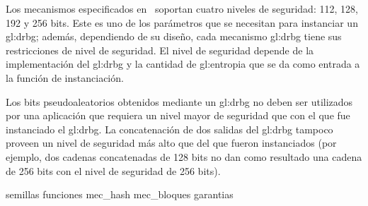 Los mecanismos especificados en~\cite{nist_aleatorios} soportan cuatro niveles
de seguridad: 112, 128, 192 y 256 bits. Este es uno de los parámetros que
se necesitan para instanciar un \gls{gl:drbg}; además, dependiendo de su diseño,
cada mecanismo  \gls{gl:drbg} tiene sus restricciones de nivel de seguridad.
El nivel de seguridad depende de la implementación del \gls{gl:drbg} y la
cantidad de \gls{gl:entropia} que se da como entrada a la función de
instanciación.

Los bits pseudoaleatorios obtenidos mediante un \gls{gl:drbg} no deben ser
utilizados por una aplicación que requiera un nivel mayor de seguridad que con
el que fue instanciado el \gls{gl:drbg}. La concatenación de dos salidas del
\gls{gl:drbg} tampoco proveen un nivel de seguridad más alto que del que fueron
instanciados (por ejemplo, dos cadenas concatenadas de 128 bits no dan como
resultado una cadena de 256 bits con el nivel de seguridad de 256 bits).

{semillas}
{funciones}
{mec_hash}
{mec_bloques}
{garantias}
